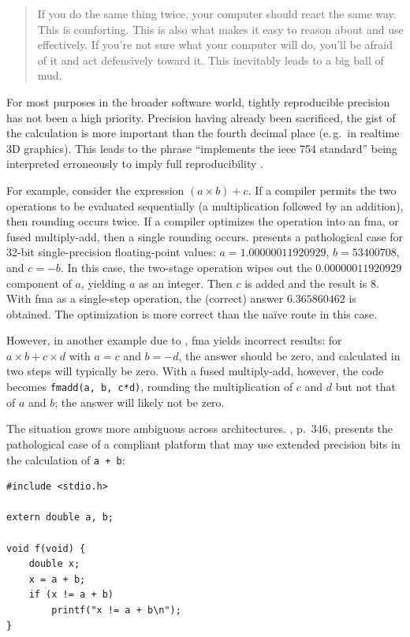 \documentclass[twoside]{article}
\begin{document}
\begin{quote}
If you do the same thing twice, your computer should react the same way.  This is comforting.  This is also what makes it easy to reason about and use effectively.  If you're not sure what your computer will do, you'll be afraid of it and act defensively toward it.  This inevitably leads to a big ball of mud.
\end{quote}

For most purposes in the broader software world, tightly reproducible precision has not been a high priority.  Precision having already been sacrificed, the gist of the calculation is more important than the fourth decimal place (e.\,g.\ in realtime 3D graphics).  This leads to the phrase “implements the {\sc ieee} 754 standard” being interpreted erroneously to imply full reproducibility \citep{Figueroa2000}.

For example, consider the expression $(a \times b) + c$.  If a compiler permits the two operations to be evaluated sequentially (a multiplication followed by an addition), then rounding occurs twice.  If a compiler optimizes the operation into an {\sc fma}, or fused multiply-add, then a single rounding occurs.  \citeauthor{Peters2021} presents a pathological case for 32-bit single-precision floating-point values:  $a = 1.00000011920929$, $b = 53400708$, and $c = -b$.  In this case, the two-stage operation wipes out the $0.00000011920929$ component of $a$, yielding $a$ as an integer.  Then $c$ is added and the result is $8$.  With {\sc fma} as a single-step operation, the (correct) answer $6.365860462$ is obtained.  The optimization is more correct than the naïve route in this case.

However, in another example due to \citeauthor{Dawson2013}, {\sc fma} yields incorrect results:  for $a \times b + c \times d$ with $a = c$ and $b = -d$, the answer should be zero, and calculated in two steps will typically be zero.  With a fused multiply-add, however, the code becomes \texttt{fmadd(a, b, c*d)}, rounding the multiplication of $c$ and $d$ but not that of $a$ and $b$; the answer will likely not be zero.

The situation grows more ambiguous across architectures.  \citet{Jones2008}, p.~346, presents the pathological case of a compliant platform that may use extended precision bits in the calculation of \texttt{a + b}:

\newpage

\begin{lstlisting}[style=listingcode_c]
#include <stdio.h>

extern double a, b;

void f(void) {
    double x;
    x = a + b;
    if (x != a + b)
        printf("x != a + b\n");
}
\end{lstlisting}
\end{document}
